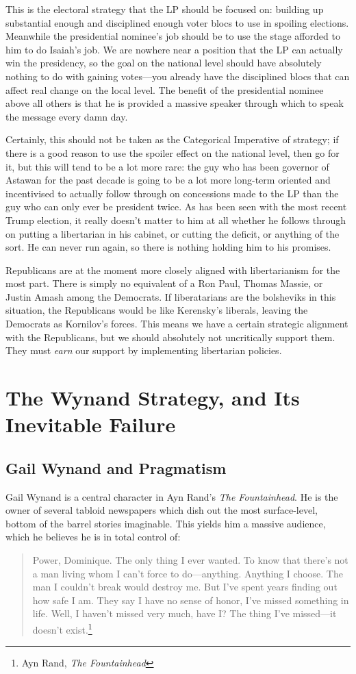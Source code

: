 \documentclass[11pt]{article}
\begin{document}
This is the electoral strategy that the LP should be focused on: building up substantial enough and disciplined enough voter blocs to use in spoiling elections. Meanwhile the presidential nominee's job should be to use the stage afforded to him to do Isaiah's job. We are nowhere near a position that the LP can actually win the presidency, so the goal on the national level should have absolutely nothing to do with gaining votes---you already have the disciplined blocs that can affect real change on the local level. The benefit of the presidential nominee above all others is that he is provided a massive speaker through which to speak the message every damn day.

Certainly, this should not be taken as the Categorical Imperative of strategy; if there is a good reason to use the spoiler effect on the national level, then go for it, but this will tend to be a lot more rare: the guy who has been governor of Astawan for the past decade is going to be a lot more long-term oriented and incentivised to actually follow through on concessions made to the LP than the guy who can only ever be president twice. As has been seen with the most recent Trump election, it really doesn't matter to him at all whether he follows through on putting a libertarian in his cabinet, or cutting the deficit, or anything of the sort. He can never run again, so there is nothing holding him to his promises.

Republicans are at the moment more closely aligned with libertarianism for the most part. There is simply no equivalent of a Ron Paul, Thomas Massie, or Justin Amash among the Democrats. If liberatarians are the bolsheviks in this situation, the Republicans would be like Kerensky's liberals, leaving the Democrats as Kornilov's forces. This means we have a certain strategic alignment with the Republicans, but we should absolutely not uncritically support them. They must \emph{earn} our support by implementing libertarian policies.
\section{The Wynand Strategy, and Its Inevitable Failure}
\label{sec:org1f4814c}
\subsection{Gail Wynand and Pragmatism}
\label{sec:org7ab8e11}
Gail Wynand is a central character in Ayn Rand's \emph{The Fountainhead}. He is the owner of several tabloid newspapers which dish out the most surface-level, bottom of the barrel stories imaginable. This yields him a massive audience, which he believes he is in total control of:
\begin{quote}
Power, Dominique. The only thing I ever wanted. To know that there's not a man living whom I can't force to do---anything. Anything I choose. The man I couldn't break would destroy me. But I've spent years finding out how safe I am. They say I have no sense of honor, I've missed something in life. Well, I haven't missed very much, have I? The thing I've missed---it doesn't exist.\footnote{Ayn Rand, \emph{The Fountainhead}}
\end{quote}
\end{document}
